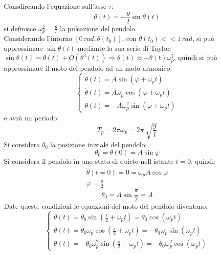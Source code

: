 \documentclass{article}
\numberwithin{equation}{subsection}
\begin{document}
Consdireando l'equazione sull'asse $\tau$: 
\begin{equation}
    \ddot\theta(t)=-\displaystyle\frac{g}{l}\sin\theta(t)
\end{equation}
si definisce $\displaystyle\omega_p^{2}=\frac{g}{l}$ la 
pulsazione del pendolo.
\\
Considerando l'intorno $[0\,rad,\theta(t_0)]$, 
con $\theta(t_0) << 1\,rad$, 
si può approssimare $\sin\theta(t)$ mediante la sua serie di Taylor: 
$\sin\theta(t) = \theta(t)+O(\theta^{3}(t))\Rightarrow\ddot\theta(t)\approx-\theta(t)\omega_p^{2}$, 
quindi si può approssimare il moto del pendolo ad un moto 
armonico: 
\begin{equation*}
    \begin{cases}
        \theta(t)=A\sin(\varphi+\omega_pt)\\
        \dot\theta(t)=A\omega_p\cos(\varphi+\omega_pt)\\
        \ddot\theta(t)=-A\omega_p^{2}\sin(\varphi+\omega_pt)
    \end{cases}
\end{equation*}
e avrà un periodo:
\begin{equation} 
    T_p =2\pi\omega_p=2\pi\displaystyle\sqrt[]{\frac{g}{l}}
\end{equation}
Si considera $\theta_0$ la posizione iniziale del 
pendolo: 
\begin{equation*}
    \theta_0=\theta(0)=A\sin\varphi
\end{equation*}
Si considera il pendolo in uno stato di quiete nell istante $t=0$, 
quindi:
\begin{gather*}
    \dot\theta(t=0)=0=\omega_pA\cos\varphi\\
    \varphi=\displaystyle\frac{\pi}{2}
\end{gather*}
\begin{equation}
    \theta_0=A\sin\frac{\pi}{2}=A
\end{equation}
Date queste condizioni le equazioni del moto del pendolo diventano: 
\begin{equation*}
    \begin{cases}
        \displaystyle\theta(t)=\theta_0\sin\left(\frac{\pi}{2}+\omega_pt\right)=\theta_0\cos(\omega_pt)\\
        \displaystyle\dot\theta(t)=\theta_0\omega_p\cos\left(\frac{\pi}{2}+\omega_pt\right)=-\theta_0\omega_p\sin(\omega_pt)\\
        \displaystyle\ddot\theta(t)=-\theta_0\omega_p^{2}\sin\left(\frac{\pi}{2}+\omega_pt\right)=-\theta_0\omega_p^{2}\cos(\omega_pt)
    \end{cases}
\end{equation*}
\end{document}
